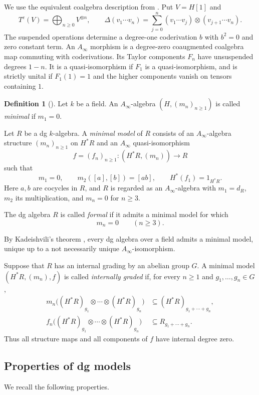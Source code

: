 \documentclass[12pt,a4paper,english,reqno]{amsart}
\theoremstyle{plain}
\theoremstyle{definition}
\newtheorem{dfn*}[thm]{Definition}
\numberwithin{equation}{section}
\def\De{\Delta}
\def\ox{\otimes}
\def\Ds{\bigoplus}
\def\Ainf{A_\infty}
\begin{document}
We use the equivalent coalgebra description from
\cite[Section 3.6]{KellerAinf}. Put $V=H[1]$ and
\[
 T^c(V)=\Ds_{n\ge0}V^{\ox n},\qquad
 \De(v_1\cdots v_n)=\sum_{j=0}^n
       (v_1\cdots v_j)\ox(v_{j+1}\cdots v_n).
\]
The suspended operations determine a degree-one coderivation $b$
with $b^2=0$ and zero constant term. An $\Ainf$ morphism is a
degree-zero coaugmented coalgebra map commuting with coderivations.
Its Taylor components $F_n$ have unsuspended degrees $1-n$.
It is a quasi-isomorphism if $F_1$ is a quasi-isomorphism, and is
strictly unital if $F_1(1)=1$ and the higher components vanish on
tensors containing $1$.

\begin{dfn*}[{\cite[Section 3.3]{KellerAinf}}]
\label{def:minimal-model}
Let $k$ be a field. An $\Ainf$-algebra $(H,(m_n)_{n\geq1})$
is called \emph{minimal} if $m_1=0$.

Let $R$ be a dg $k$-algebra. A \emph{minimal model} of $R$
consists of an $\Ainf$-algebra structure $(m_n)_{n\geq1}$
on $H^*R$ and an $\Ainf$ quasi-isomorphism
\[
 f=(f_n)_{n\geq1}:(H^*R,(m_n))\longrightarrow R
\]
such that
\[
 m_1=0,\qquad
 m_2([a],[b])=[ab],\qquad
 H^*(f_1)=1_{H^*R}.
\]
Here $a,b$ are cocycles in $R$, and $R$ is regarded as an
$\Ainf$-algebra with $m_1=d_R$, $m_2$ its multiplication,
and $m_n=0$ for $n\geq3$.

The dg algebra $R$ is called \emph{formal} if it admits
a minimal model for which
\[
 m_n=0\qquad(n\geq3).
\]
\end{dfn*}

By Kadeishvili's theorem
\cite[Section 3.3]{KellerAinf}, every dg algebra over a field
admits a minimal model, unique up to a not necessarily unique
$\Ainf$-isomorphism.

Suppose that $R$ has an internal grading by an abelian group $G$.
A minimal model $(H^*R,(m_n),f)$ is called \emph{internally graded}
if, for every $n\geq1$ and $g_1,\ldots,g_n\in G$,
\[
\begin{aligned}
 m_n\bigl((H^*R)_{g_1}\ox\cdots\ox(H^*R)_{g_n}\bigr)
 &\subseteq (H^*R)_{g_1+\cdots+g_n},\\
 f_n\bigl((H^*R)_{g_1}\ox\cdots\ox(H^*R)_{g_n}\bigr)
 &\subseteq R_{g_1+\cdots+g_n}.
\end{aligned}
\]
Thus all structure maps and all components of $f$ have
internal degree zero.

\subsection{Properties of dg models}\label{subsec:standard-properties}
We recall the following properties.
\end{document}
